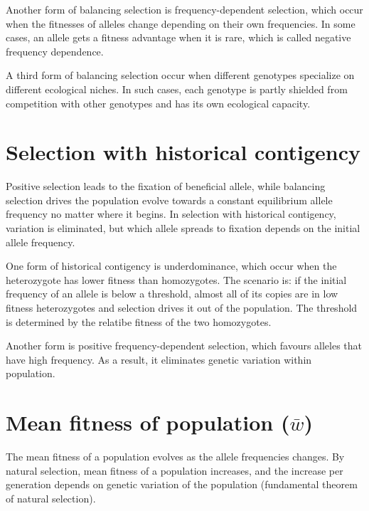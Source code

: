 \documentclass[11pt]{article}
\begin{document}
\begin{sloppypar}
\par

Another form of balancing selection is frequency-dependent selection, which occur when the fitnesses of alleles change depending on their own frequencies. 
In some cases, an allele gets a fitness advantage when it is rare, which is called negative frequency dependence. 

\par

A third form of balancing selection occur when different genotypes specialize on different ecological niches. 
In such cases, each genotype is partly shielded from competition with other genotypes and has its own ecological capacity. 

\section{Selection with historical contigency}
Positive selection leads to the fixation of beneficial allele, while balancing selection drives the population evolve towards a constant equilibrium allele frequency no matter where it begins. 
In selection with historical contigency, variation is eliminated, but which allele spreads to fixation depends on the initial allele frequency. 

\par

One form of historical contigency is underdominance, which occur when the heterozygote has lower fitness than homozygotes. 
The scenario is: if the initial frequency of an allele is below a threshold, almost all of its copies are in low fitness heterozygotes and selection drives it out of the population. 
The threshold is determined by the relatibe fitness of the two homozygotes. 

\par

Another form is positive frequency-dependent selection, which favours alleles that have high frequency. 
As a result, it eliminates genetic variation within population. 

\section{Mean fitness of population ($\bar{w}$)}
The mean fitness of a population evolves as the allele frequencies changes. 
By natural selection, mean fitness of a population increases, and the increase per generation depends on genetic variation of the population (fundamental theorem of natural selection). 


\end{sloppypar}
\end{document}
